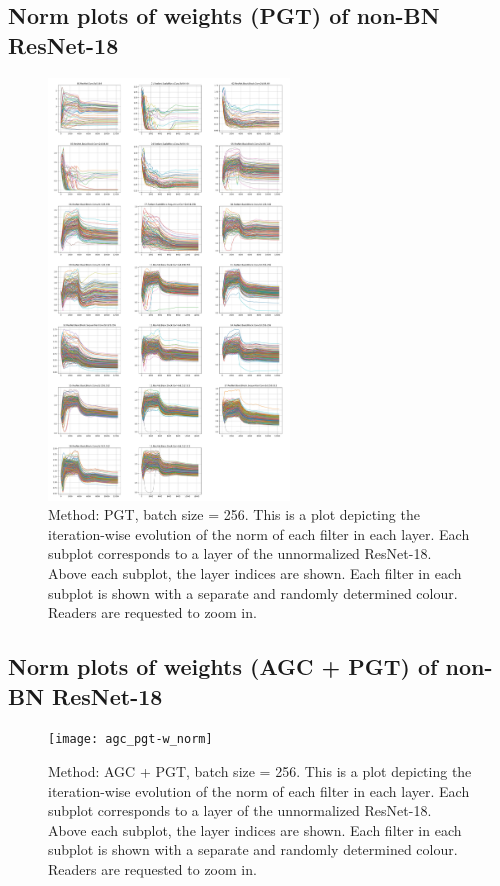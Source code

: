 \documentclass[runningheads]{llncs}
\begin{document}
\subsection{Norm plots of weights (PGT) of non-BN ResNet-18}
\label{sec:plots3}
\begin{figure}[ht] \centering \includegraphics[width=0.57\textwidth]{pgt-w_norm}
\caption{ Method: PGT, batch size = 256. This is a plot depicting the iteration-wise
evolution of the norm of each filter in each layer. Each subplot corresponds to a layer
of the unnormalized ResNet-18. Above each subplot, the layer indices are shown. Each
filter in each subplot is shown with a separate and randomly determined colour. Readers
are requested to zoom in. }
\end{figure}

\clearpage

\subsection{Norm plots of weights (AGC + PGT) of non-BN ResNet-18}
\label{sec:plots4}
\begin{figure}[ht] \centering \texttt{[image: agc\_pgt-w\_norm]}
\caption{ Method: AGC + PGT, batch size = 256. This is a plot depicting the
iteration-wise evolution of the norm of each filter in each layer. Each subplot
corresponds to a layer of the unnormalized ResNet-18. Above each subplot, the layer
indices are shown. Each filter in each subplot is shown with a separate and randomly
determined colour.
Readers are requested to zoom in. } \end{figure}
\end{document}
